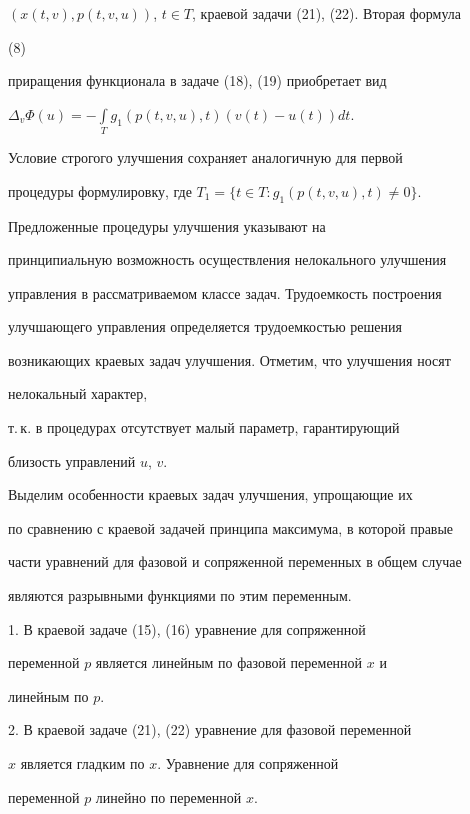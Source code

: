 $(x(t,v),p(t,v,u))$, $t\in T$, краевой задачи (21), (22). Вторая формула 


(8) 


приращения функционала в задаче (18), (19) приобретает вид 


$\Delta_v\Phi(u)=-\int\limits_T g_1(p(t,v,u),t)(v(t)-u(t))dt$.


Условие строгого улучшения сохраняет аналогичную для первой


процедуры формулировку, где $T_1=\{t\in T:g_1(p(t,v,u),t)\ne0\}$.





Предложенные процедуры улучшения указывают на


принципиальную возможность осуществления нелокального улучшения 


управления в рассматриваемом классе задач. Трудоемкость построения


улучшающего управления определяется трудоемкостью решения


возникающих краевых задач улучшения. Отметим, что улучшения носят


нелокальный характер,


т.\,к. в процедурах отсутствует малый параметр, гарантирующий


близость управлений $u$, $v$.





Выделим особенности краевых задач улучшения, упрощающие их 


по сравнению с краевой задачей принципа максимума, в которой правые 


части уравнений для фазовой и сопряженной переменных в общем случае 


являются разрывными функциями по этим переменным.





1. В краевой задаче (15), (16) уравнение для сопряженной 


переменной $p$ является линейным по фазовой переменной $x$ и 


линейным по $p$.





2. В краевой задаче (21), (22) уравнение для фазовой переменной 


$x$ является гладким по $x$. Уравнение для сопряженной 


переменной $p$ линейно по переменной $x$.





